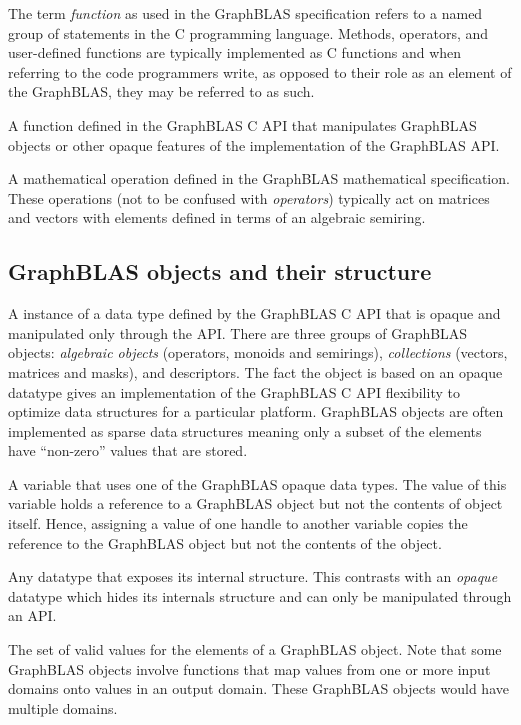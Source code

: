  The term \emph{function} as used in the GraphBLAS specification
refers to a named group of statements in the C programming language.  Methods, operators,
and user-defined functions are typically implemented as C functions and when referring to 
the code programmers write, as opposed to their role as an element of the GraphBLAS, they may
be referred to as such.

 A function defined in the GraphBLAS C API that manipulates
GraphBLAS objects or other opaque features of the implementation of the GraphBLAS API.

 A mathematical operation defined in the
GraphBLAS mathematical specification. These operations (not to be confused with \emph{operators}) typically act
on matrices and vectors with elements defined in terms of an algebraic semiring. 
\glossEnd

\subsection{GraphBLAS objects and their structure}

\glossBegin
{}  A instance of a data type defined by the GraphBLAS C
API that is opaque and manipulated only through the API. There are three groups of 
GraphBLAS objects: \emph{algebraic objects} (operators, monoids and semirings), 
\emph{collections} (vectors, matrices and masks), and descriptors.   The fact the object
is based on an opaque datatype gives an implementation of the GraphBLAS C API
flexibility to optimize data structures for a particular platform.  GraphBLAS objects
are often implemented as sparse data structures meaning only a subset of the
elements have ``non-zero'' values that are stored.

  A variable that uses one of the GraphBLAS opaque data types.
The value of this variable holds a reference to a GraphBLAS object but not the contents of object itself.  
Hence, assigning a value of one handle to another variable copies the reference to the GraphBLAS object
but not the contents of the object.

 Any datatype that exposes its internal structure.   This contrasts
with an \emph{opaque} datatype which hides its internals structure and can only
be manipulated through an API.

 The set of valid values for the elements of a GraphBLAS object.
Note that some GraphBLAS objects involve functions that map values from one or more input domains 
onto values in an output domain.  These GraphBLAS objects would have multiple domains.

